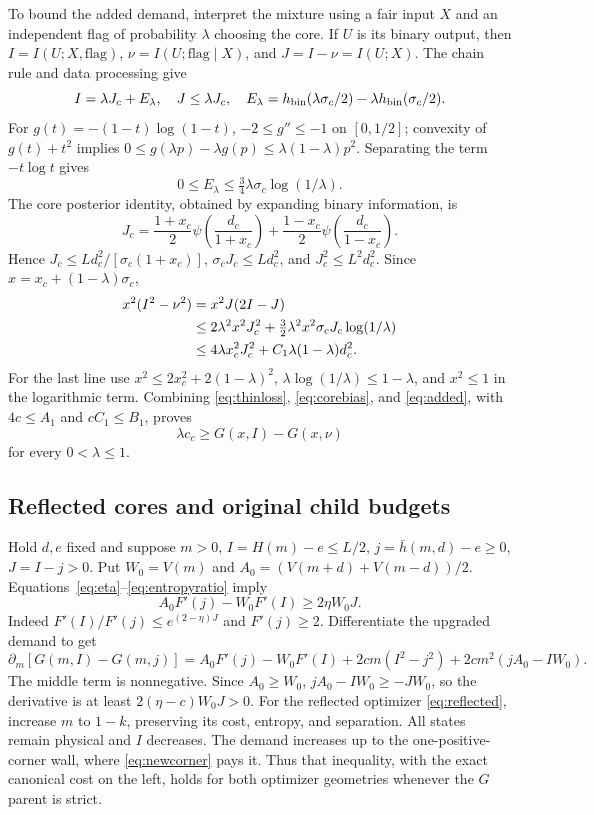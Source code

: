 To bound the added demand, interpret the mixture using a fair input
$X$ and an independent flag of probability $\lambda$ choosing the core.
If $U$ is its binary output, then $I=I(U;X,\mathrm{flag})$,
$\nu=I(U;\mathrm{flag}\mid X)$, and $J=I-\nu=I(U;X)$.
The chain rule and data processing give
\[
 I=\lambda J_c+E_\lambda,\quad J\le\lambda J_c,
 \quad E_\lambda=h_{\rm bin}(\lambda\sigma_c/2)
                       -\lambda h_{\rm bin}(\sigma_c/2).
\]
For $g(t)=-(1-t)\log(1-t)$, $-2\le g''\le-1$ on $[0,1/2]$;
convexity of $g(t)+t^2$ implies
$0\le g(\lambda p)-\lambda g(p)\le\lambda(1-\lambda)p^2$.
Separating the term $-t\log t$ gives
\[
 0\le E_\lambda\le\tfrac34\lambda\sigma_c\log(1/\lambda).
\]
The core posterior identity, obtained by expanding binary information,
is
\[
 J_c=\frac{1+x_c}{2}\psi\!\left(\frac{d_c}{1+x_c}\right)
     +\frac{1-x_c}{2}\psi\!\left(\frac{d_c}{1-x_c}\right).
\]
Hence $J_c\le Ld_c^2/[\sigma_c(1+x_c)]$,
$\sigma_cJ_c\le Ld_c^2$, and $J_c^2\le L^2d_c^2$.
Since $x=x_c+(1-\lambda)\sigma_c$,
\begin{align}
 x^2(I^2-\nu^2)&=x^2J(2I-J)\notag\\
 &\le2\lambda^2x^2J_c^2
       +\tfrac32\lambda^2x^2\sigma_cJ_c\log(1/\lambda)\notag\\
 &\le4\lambda x_c^2J_c^2+C_1\lambda(1-\lambda)d_c^2.\label{eq:added}
\end{align}
For the last line use $x^2\le2x_c^2+2(1-\lambda)^2$,
$\lambda\log(1/\lambda)\le1-\lambda$, and $x^2\le1$ in the logarithmic
term. Combining \eqref{eq:thinloss}, \eqref{eq:corebias}, and
\eqref{eq:added}, with $4c\le A_1$ and $cC_1\le B_1$, proves
\begin{equation}\label{eq:newcorner}
 \lambda c_c\ge G(x,I)-G(x,\nu)
\end{equation}
for every $0<\lambda\le1$.

\subsection{Reflected cores and original child budgets}
Hold $d,e$ fixed and suppose $m>0$,
$I=H(m)-e\le L/2$, $j=\bar h(m,d)-e\ge0$, $J=I-j>0$.
Put $W_0=V(m)$ and $A_0=(V(m+d)+V(m-d))/2$.
Equations~\eqref{eq:eta}--\eqref{eq:entropyratio} imply
\[
 A_0F'(j)-W_0F'(I)\ge2\eta W_0J.
\]
Indeed $F'(I)/F'(j)\le e^{(2-\eta)J}$ and $F'(j)\ge2$.
Differentiate the upgraded demand to get
\[
 \partial_m[G(m,I)-G(m,j)]
 =A_0F'(j)-W_0F'(I)+2cm(I^2-j^2)+2cm^2(jA_0-IW_0).
\]
The middle term is nonnegative. Since $A_0\ge W_0$,
$jA_0-IW_0\ge-JW_0$, so the derivative is at least
$2(\eta-c)W_0J>0$.
For the reflected optimizer \eqref{eq:reflected}, increase $m$ to
$1-k$, preserving its cost, entropy, and separation. All states remain
physical and $I$ decreases. The demand increases up to the
one-positive-corner wall, where \eqref{eq:newcorner} pays it.
Thus that inequality, with the exact canonical cost on the left,
holds for both optimizer geometries whenever the $G$ parent is strict.

